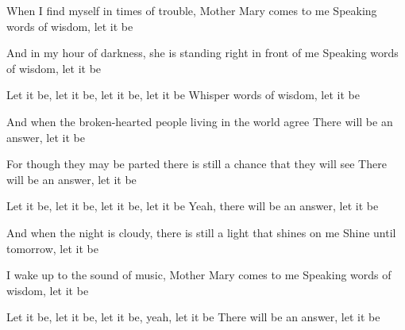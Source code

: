 \begin{verse*}
When I find myself in times of trouble, Mother Mary comes to me
Speaking words of wisdom, let it be
\end{verse*}

\begin{verse*}
And in my hour of darkness, she is standing right in front of me
Speaking words of wisdom, let it be
\end{verse*}

\begin{chorus}
Let it be, let it be, let it be, let it be
Whisper words of wisdom, let it be
\end{chorus}

\begin{verse*}
And when the broken-hearted people living in the world agree
There will be an answer, let it be
\end{verse*}

\begin{verse*}
For though they may be parted there is still a chance that they will see
There will be an answer, let it be
\end{verse*}

\begin{verse*}
Let it be, let it be, let it be, let it be
Yeah, there will be an answer, let it be
\end{verse*}

\thechorus[2]

\begin{verse*}
And when the night is cloudy, there is still a light that shines on me
Shine until tomorrow, let it be
\end{verse*}

\begin{verse*}
I wake up to the sound of music, Mother Mary comes to me
Speaking words of wisdom, let it be
\end{verse*}

\begin{verse*}
Let it be, let it be, let it be, yeah, let it be
There will be an answer, let it be
\end{verse*}

\thechorus
